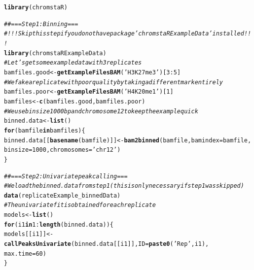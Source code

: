 \documentclass[11pt]{article}\usepackage[]{graphicx}\usepackage[]{color}
\makeatletter
\newcommand{\hlnum}[1]{\textcolor[rgb]{0.686,0.059,0.569}{#1}}%
\newcommand{\hlstr}[1]{\textcolor[rgb]{0.192,0.494,0.8}{#1}}%
\newcommand{\hlcom}[1]{\textcolor[rgb]{0.678,0.584,0.686}{\textit{#1}}}%
\newcommand{\hlopt}[1]{\textcolor[rgb]{0,0,0}{#1}}%
\newcommand{\hlstd}[1]{\textcolor[rgb]{0.345,0.345,0.345}{#1}}%
\newcommand{\hlkwa}[1]{\textcolor[rgb]{0.161,0.373,0.58}{\textbf{#1}}}%
\newcommand{\hlkwb}[1]{\textcolor[rgb]{0.69,0.353,0.396}{#1}}%
\newcommand{\hlkwc}[1]{\textcolor[rgb]{0.333,0.667,0.333}{#1}}%
\newcommand{\hlkwd}[1]{\textcolor[rgb]{0.737,0.353,0.396}{\textbf{#1}}}%
\newenvironment{kframe}{%
 \def\at@end@of@kframe{}%
 \ifinner\ifhmode%
  \def\at@end@of@kframe{\end{minipage}}%
  \begin{minipage}{\columnwidth}%
 \fi\fi%
 \def\FrameCommand##1{\hskip\@totalleftmargin \hskip-\fboxsep
 \colorbox{shadecolor}{##1}\hskip-\fboxsep
     \hskip-\linewidth \hskip-\@totalleftmargin \hskip\columnwidth}%
 \MakeFramed {\advance\hsize-\width
   \@totalleftmargin\z@ \linewidth\hsize
   \@setminipage}}%
 {\par\unskip\endMakeFramed%
 \at@end@of@kframe}
\newenvironment{knitrout}{}{} %
\makeatother
\begin{document}
\begin{scriptsize}
\begin{knitrout}
\color{fgcolor}\begin{kframe}
\begin{alltt}
\hlkwd{library}\hlstd{(chromstaR)}
\end{alltt}
\end{kframe}
\end{knitrout}

\begin{knitrout}
\color{fgcolor}\begin{kframe}
\begin{alltt}
\hlcom{## === Step 1: Binning ===}
\hlcom{# !!! Skip this step if you do not have package 'chromstaRExampleData' installed !!!}
\hlkwd{library}\hlstd{(chromstaRExampleData)}
\hlcom{# Let's get some example data with 3 replicates}
\hlstd{bamfiles.good} \hlkwb{<-} \hlkwd{getExampleFilesBAM}\hlstd{(}\hlstr{'H3K27me3'}\hlstd{)[}\hlnum{3}\hlopt{:}\hlnum{5}\hlstd{]}
\hlcom{# We fake a replicate with poor quality by taking a different mark entirely}
\hlstd{bamfiles.poor} \hlkwb{<-} \hlkwd{getExampleFilesBAM}\hlstd{(}\hlstr{'H4K20me1'}\hlstd{)[}\hlnum{1}\hlstd{]}
\hlstd{bamfiles} \hlkwb{<-} \hlkwd{c}\hlstd{(bamfiles.good, bamfiles.poor)}
\hlcom{# We use bin size 1000bp and chromosome 12 to keep the example quick}
\hlstd{binned.data} \hlkwb{<-} \hlkwd{list}\hlstd{()}
\hlkwa{for} \hlstd{(bamfile} \hlkwa{in} \hlstd{bamfiles) \{}
  \hlstd{binned.data[[}\hlkwd{basename}\hlstd{(bamfile)]]} \hlkwb{<-} \hlkwd{bam2binned}\hlstd{(bamfile,} \hlkwc{bamindex}\hlstd{=bamfile,}
                                                 \hlkwc{binsize}\hlstd{=}\hlnum{1000}\hlstd{,} \hlkwc{chromosomes}\hlstd{=}\hlstr{'chr12'}\hlstd{)}
\hlstd{\}}
\end{alltt}
\end{kframe}
\end{knitrout}

\begin{knitrout}
\color{fgcolor}\begin{kframe}
\begin{alltt}
\hlcom{## === Step 2: Univariate peak calling ===}
\hlcom{# We load the binned.data from step 1 (this is only necessary if step 1 was skipped)}
\hlkwd{data}\hlstd{(replicateExample_binnedData)}
\hlcom{# The univariate fit is obtained for each replicate}
\hlstd{models} \hlkwb{<-} \hlkwd{list}\hlstd{()}
\hlkwa{for} \hlstd{(i1} \hlkwa{in} \hlnum{1}\hlopt{:}\hlkwd{length}\hlstd{(binned.data)) \{}
  \hlstd{models[[i1]]} \hlkwb{<-} \hlkwd{callPeaksUnivariate}\hlstd{(binned.data[[i1]],} \hlkwc{ID}\hlstd{=}\hlkwd{paste0}\hlstd{(}\hlstr{'Rep'}\hlstd{,i1),}
                                      \hlkwc{max.time}\hlstd{=}\hlnum{60}\hlstd{)}
\hlstd{\}}
\end{alltt}
\end{kframe}
\end{knitrout}


\end{scriptsize}
\end{document}
